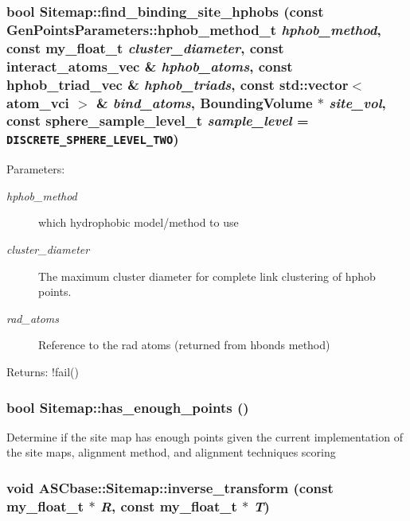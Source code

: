 \subsubsection{\setlength{\rightskip}{0pt plus 5cm}bool Sitemap::find\_\-binding\_\-site\_\-hphobs (const \bf{Gen\-Points\-Parameters::hphob\_\-method\_\-t} {\em hphob\_\-method}, const my\_\-float\_\-t {\em cluster\_\-diameter}, const interact\_\-atoms\_\-vec \& {\em hphob\_\-atoms}, const hphob\_\-triad\_\-vec \& {\em hphob\_\-triads}, const std::vector$<$ atom\_\-vci $>$ \& {\em bind\_\-atoms}, \bf{Bounding\-Volume} $\ast$ {\em site\_\-vol}, const sphere\_\-sample\_\-level\_\-t {\em sample\_\-level} = {\tt DISCRETE\_\-SPHERE\_\-LEVEL\_\-TWO})\hspace{0.3cm}{\tt  [private]}}\label{classASCbase_1_1Sitemap_955ee3f2bcb9a0853c49c98f9664310b}


\begin{Desc}
\item[Parameters:]
\begin{description}
\item[{\em hphob\_\-method}]which hydrophobic model/method to use \item[{\em cluster\_\-diameter}]The maximum cluster diameter for complete link clustering of hphob points. \item[{\em rad\_\-atoms}]Reference to the rad atoms (returned from hbonds method) \end{description}
\end{Desc}
\begin{Desc}
\item[Returns:]!fail() \end{Desc}
\subsubsection{\setlength{\rightskip}{0pt plus 5cm}bool Sitemap::has\_\-enough\_\-points ()}\label{classASCbase_1_1Sitemap_e9d2433452ba04908e7ef43cbe7d8c3c}


Determine if the site map has enough points given the current implementation of the site maps, alignment method, and alignment techniques scoring 
\subsubsection{\setlength{\rightskip}{0pt plus 5cm}void ASCbase::Sitemap::inverse\_\-transform (const my\_\-float\_\-t $\ast$ {\em R}, const my\_\-float\_\-t $\ast$ {\em T})\hspace{0.3cm}{\tt  [inline]}}\label{classASCbase_1_1Sitemap_9923d897faab8e6b015908311241ac3a}


